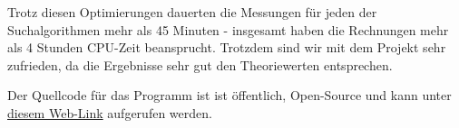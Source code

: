 \documentclass[a4paper,11pt]{article}
\begin{document}
Trotz diesen Optimierungen dauerten die Messungen für jeden der Suchalgorithmen mehr als 45 Minuten - insgesamt haben die Rechnungen mehr als 4 Stunden CPU-Zeit beansprucht. Trotzdem sind wir mit dem Projekt sehr zufrieden, da die Ergebnisse sehr gut den Theoriewerten entsprechen.

Der Quellcode für das Programm ist ist öffentlich, Open-Source und kann unter \href{https://github.com/Kepler-69c/binaryTree}{diesem Web-Link} aufgerufen werden.

\pagebreak


\end{document}
